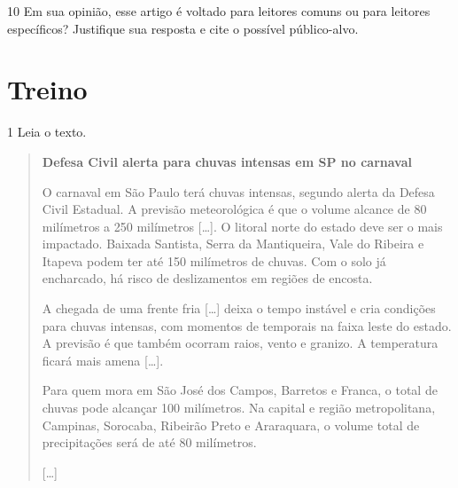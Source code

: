 \num{10} Em sua opinião, esse artigo é voltado para leitores comuns ou
para leitores específicos? Justifique sua resposta e cite o possível público-alvo.


\pagebreak

\section{Treino}

\num{1} Leia o texto.

\begin{quote}
\centering\textbf{Defesa Civil alerta para chuvas intensas em SP no carnaval}


O carnaval em São Paulo terá chuvas intensas, segundo alerta da Defesa
Civil Estadual. A previsão meteorológica é que o volume alcance de 80
milímetros a 250 milímetros {[}\ldots{]}. O litoral norte do estado deve
ser o mais impactado. Baixada Santista, Serra da Mantiqueira, Vale do
Ribeira e Itapeva podem ter até 150 milímetros de chuvas. Com o solo já
encharcado, há risco de deslizamentos em regiões de encosta.

A chegada de uma frente fria {[}\ldots{]} deixa o tempo instável e cria
condições para chuvas intensas, com momentos de temporais na faixa leste
do estado. A previsão é que também ocorram raios, vento e granizo. A
temperatura ficará mais amena {[}\ldots{]}.

Para quem mora em São José dos Campos, Barretos e Franca, o total de
chuvas pode alcançar 100 milímetros. Na capital e região
metropolitana, Campinas, Sorocaba, Ribeirão Preto e Araraquara, o volume
total de precipitações será de até 80 milímetros.

{[}\ldots{]}

\end{quote}

